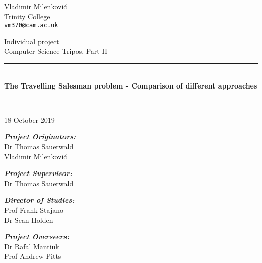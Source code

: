 \newcommand{\HRulee}{\rule{\linewidth}{0.5mm}}

\vfil

{\raggedleft \large Vladimir Milenkovi\'{c} \\}
{\raggedleft \large Trinity College \\}
{\raggedleft \large \tt vm370@cam.ac.uk \\}

\vfil

\begin{center}

	{\Large \sc Individual project \\}
	\vspace{10pt}
	{\Large \sc Computer Science Tripos, Part II \\}
	\vspace{20pt}
	\HRulee \\[0.1cm]
	{\LARGE \bf The Travelling Salesman problem - Comparison of different approaches \\}
	\HRulee \\[20pt]
	{\Large 18 October 2019 \\}
	\vspace{20pt}
\end{center}

\vfil

\noindent\emph{\textbf{Project Originators:}}\\
	Dr Thomas Sauerwald\\
	Vladimir Milenkovi\'{c}\\

\vspace{10pt}

\noindent\emph{\textbf{Project Supervisor:}}\\
	Dr Thomas Sauerwald\\

\vspace{10pt}

\noindent\emph{\textbf{Director of Studies:}}\\
	Prof Frank Stajano\\
	Dr Sean Holden\\

\vspace{10pt}

\noindent\emph{\textbf{Project Overseers:}}\\
	Dr Rafal Mantiuk\\
	Prof Andrew Pitts\\

\newpage

